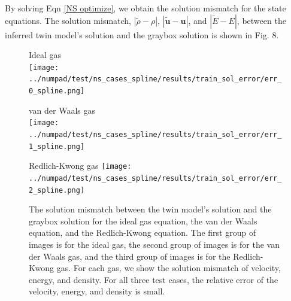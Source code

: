 \documentclass[a4paper,onecolumn]{article}
\theoremstyle{remark}
\begin{document}
\indent 
By solving Eqn \eqref{NS optimize}, we obtain the solution mismatch for the state equations.
The solution mismatch,
 $\left|\tilde{\rho} -\rho\right|$, $\left|\tilde{\boldsymbol{u}}- \boldsymbol{u}\right|$, 
and $\left|\tilde{E}-E\right|$,
between the inferred twin model's solution and the graybox solution is shown in Fig. 8.
\begin{figure}[H]\begin{center}
    \centering Ideal gas\\
    \texttt{[image: ../numpad/test/ns\_cases\_spline/results/train\_sol\_error/err\_0\_spline.png]}\\
\end{center}\end{figure}
\begin{figure}[H]\begin{center}
    \centering van der Waals gas\\
    \texttt{[image: ../numpad/test/ns\_cases\_spline/results/train\_sol\_error/err\_1\_spline.png]}
\end{center}\end{figure}
\begin{figure}[H]\begin{center}
    \centering Redlich-Kwong gas
    \texttt{[image: ../numpad/test/ns\_cases\_spline/results/train\_sol\_error/err\_2\_spline.png]}\\
    \caption{The solution mismatch between the twin model's solution and the graybox solution for the
    ideal gas equation, the van der Waals equation, and the Redlich-Kwong equation. 
    The first group of images is for the ideal gas, the second group of images is for the van der Waals
    gas, and the third group of images is for the Redlich-Kwong gas. For each gas, we show 
    the solution mismatch of velocity, energy, and density. For all
    three test cases, the relative error of the velocity, energy, and density is small.}
    \label{fig:NS sol err}
\end{center}\end{figure}
\end{document}
